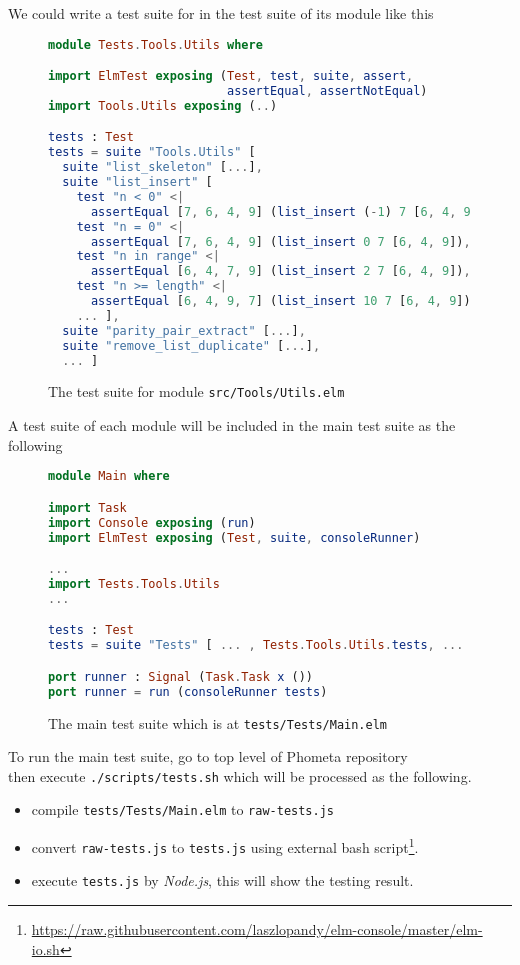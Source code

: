 \documentclass[master.tex]{subfiles}
\begin{document}
We could write a test suite for  in the test suite of its module like this

\begin{figure}[H]
\begin{framed}
\begin{lstlisting}[language=elm]
module Tests.Tools.Utils where

import ElmTest exposing (Test, test, suite, assert,
                         assertEqual, assertNotEqual)
import Tools.Utils exposing (..)

tests : Test
tests = suite "Tools.Utils" [
  suite "list_skeleton" [...],
  suite "list_insert" [
    test "n < 0" <|
      assertEqual [7, 6, 4, 9] (list_insert (-1) 7 [6, 4, 9]),
    test "n = 0" <|
      assertEqual [7, 6, 4, 9] (list_insert 0 7 [6, 4, 9]),
    test "n in range" <|
      assertEqual [6, 4, 7, 9] (list_insert 2 7 [6, 4, 9]),
    test "n >= length" <|
      assertEqual [6, 4, 9, 7] (list_insert 10 7 [6, 4, 9]),
    ... ],
  suite "parity_pair_extract" [...],
  suite "remove_list_duplicate" [...],
  ... ]
\end{lstlisting}
\end{framed}
\caption{The test suite for module \texttt{src/Tools/Utils.elm}}
\label{fig:implementation-test-test}
\end{figure}

A test suite of each module will be included in the main test suite as the
following

\begin{figure}[H]
\begin{framed}
\begin{lstlisting}[language=elm]
module Main where

import Task
import Console exposing (run)
import ElmTest exposing (Test, suite, consoleRunner)

...
import Tests.Tools.Utils
...

tests : Test
tests = suite "Tests" [ ... , Tests.Tools.Utils.tests, ... ]

port runner : Signal (Task.Task x ())
port runner = run (consoleRunner tests)
\end{lstlisting}
\end{framed}
\caption{The main test suite which is at \texttt{tests/Tests/Main.elm}}
\label{fig:implementation-test-main}
\end{figure}

To run the main test suite, go to top level of Phometa repository\\ then execute
\texttt{./scripts/tests.sh} which will be processed as the following.
\begin{itemize}
\item compile \texttt{tests/Tests/Main.elm} to \texttt{raw-tests.js}
\item convert \texttt{raw-tests.js} to \texttt{tests.js} using external bash
  script\footnote{\url{https://raw.githubusercontent.com/laszlopandy/elm-console/master/elm-io.sh}}.
\item execute \texttt{tests.js} by \emph{Node.js}, this will show the testing result.
\end{itemize}
\end{document}
